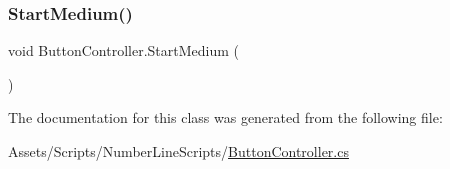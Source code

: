 \subsubsection{\texorpdfstring{Start\+Medium()}{StartMedium()}}
{\footnotesize\ttfamily void Button\+Controller.\+Start\+Medium (\begin{DoxyParamCaption}{ }\end{DoxyParamCaption})\hspace{0.3cm}{\ttfamily [inline]}}



The documentation for this class was generated from the following file\+:\begin{DoxyCompactItemize}
\item 
Assets/\+Scripts/\+Number\+Line\+Scripts/\hyperlink{ButtonController_8cs}{Button\+Controller.\+cs}\end{DoxyCompactItemize}
